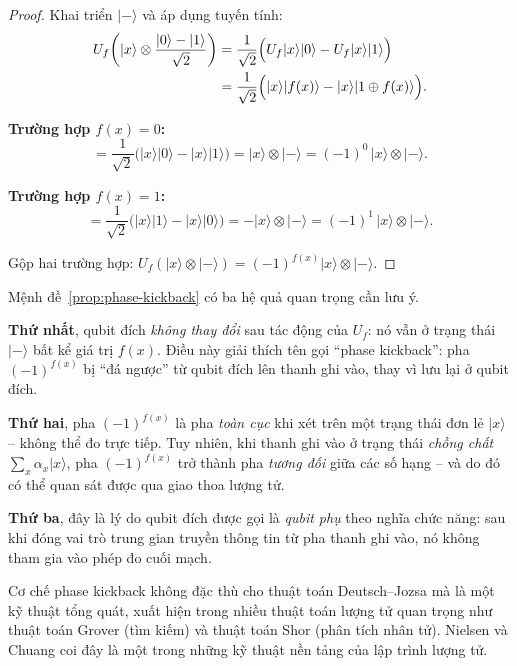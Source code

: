 \begin{proof}
Khai triển $|{-}\rangle$ và áp dụng tuyến tính:
\begin{align*}
U_f\!\left(|x\rangle \otimes \frac{|0\rangle - |1\rangle}{\sqrt{2}}\right)
&= \frac{1}{\sqrt{2}}\Bigl(
    U_f|x\rangle|0\rangle - U_f|x\rangle|1\rangle
  \Bigr) \\
&= \frac{1}{\sqrt{2}}\Bigl(
    |x\rangle|f(x)\rangle - |x\rangle|1 \oplus f(x)\rangle
  \Bigr).
\end{align*}

\noindent\textbf{Trường hợp $f(x)=0$:}
$$= \frac{1}{\sqrt{2}}\bigl(|x\rangle|0\rangle - |x\rangle|1\rangle\bigr)
= |x\rangle \otimes |{-}\rangle = (-1)^0\,|x\rangle \otimes |{-}\rangle.$$

\noindent\textbf{Trường hợp $f(x)=1$:}
$$= \frac{1}{\sqrt{2}}\bigl(|x\rangle|1\rangle - |x\rangle|0\rangle\bigr)
= -|x\rangle \otimes |{-}\rangle = (-1)^1\,|x\rangle \otimes |{-}\rangle.$$

Gộp hai trường hợp: $U_f(|x\rangle \otimes |{-}\rangle)
= (-1)^{f(x)}|x\rangle \otimes |{-}\rangle$.
\end{proof}

\begin{remark}
Mệnh đề~\ref{prop:phase-kickback} có ba hệ quả quan trọng cần lưu ý.

\textbf{Thứ nhất}, qubit đích \emph{không thay đổi} sau tác động của $U_f$: nó
vẫn ở trạng thái $|{-}\rangle$ bất kể giá trị $f(x)$. Điều này giải thích tên
gọi ``phase kickback'': pha $(-1)^{f(x)}$ bị ``đá ngược'' từ qubit đích lên
thanh ghi vào, thay vì lưu lại ở qubit đích.

\textbf{Thứ hai}, pha $(-1)^{f(x)}$ là pha \emph{toàn cục} khi xét trên một
trạng thái đơn lẻ $|x\rangle$ -- không thể đo trực tiếp. Tuy nhiên, khi thanh ghi vào ở trạng thái
\emph{chồng chất} $\sum_x \alpha_x|x\rangle$, pha $(-1)^{f(x)}$ trở thành pha
\emph{tương đối} giữa các số hạng -- và do đó có thể quan sát được qua giao
thoa lượng tử.

\textbf{Thứ ba}, đây là lý do qubit đích được gọi là \emph{qubit phụ} theo
nghĩa chức năng: sau khi đóng vai trò trung gian truyền thông tin từ pha
thanh ghi vào, nó không tham gia vào phép đo cuối mạch.
\end{remark}

\begin{remark}
Cơ chế phase kickback không đặc thù cho thuật toán Deutsch--Jozsa mà là một
kỹ thuật tổng quát, xuất hiện trong nhiều thuật toán lượng tử quan trọng như
thuật toán Grover (tìm kiếm) và thuật toán Shor (phân tích nhân tử). Nielsen
và Chuang \cite{ref5} coi đây là một trong những kỹ thuật nền tảng của lập
trình lượng tử.
\end{remark}



